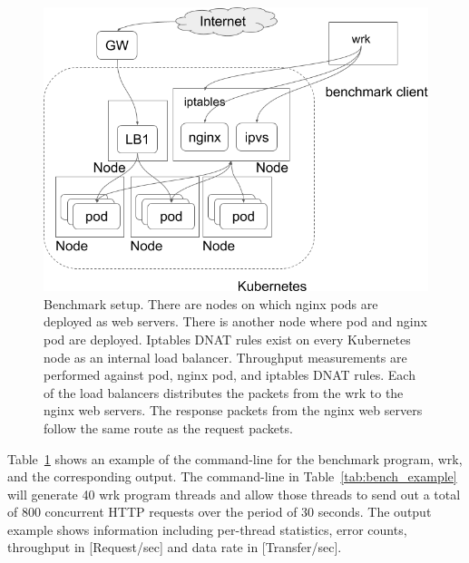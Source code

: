 \begin{figure}[h]
  \centering
  \includegraphics[width=0.8\columnwidth]{Figs/benchmark-schem}
  \par\bigskip
  \centering
  \begin{minipage}{0.9\columnwidth}
    \caption[Benchmark setup]{
      Benchmark setup.
      There are nodes on which nginx pods are deployed as web servers.
      There is another node where  pod and nginx pod are deployed.
      Iptables DNAT rules exist on every Kubernetes node as an internal load balancer.
      Throughput measurements are performed against  pod, nginx pod, and iptables DNAT rules.
      Each of the load balancers distributes the packets from the wrk to the nginx web servers.
      The response packets from the nginx web servers follow the same route as the request packets.  
    }
    \label{fig:benchmark-schem}
  \end{minipage}
\end{figure}

Table~\ref{fig:benchmark-schem} shows an example of the command-line for the benchmark program, wrk, and the corresponding output.
The command-line in Table~\ref{tab:bench_example} will generate 40 wrk program threads
and allow those threads to send out a total of 800 concurrent HTTP requests over the period of 30 seconds.
The output example shows information including per-thread statistics, error counts, throughput in [Request/sec] and data rate in [Transfer/sec].


